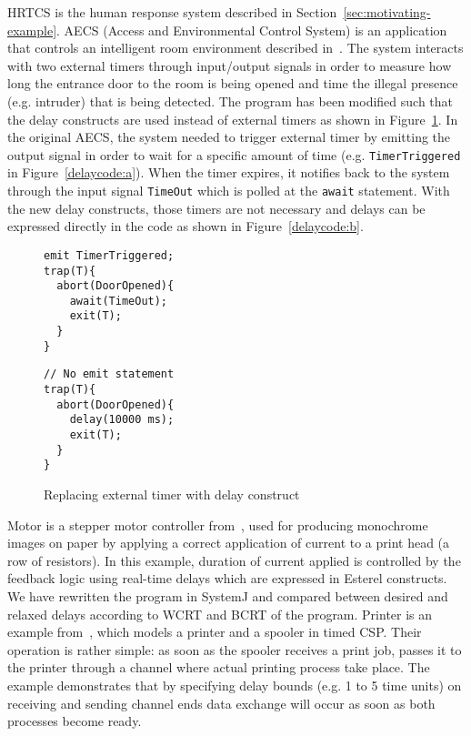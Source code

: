 HRTCS is the human response system described in
Section~\ref{sec:motivating-example}. AECS (Access and Environmental
Control System) is an application that controls an intelligent room
environment described in~\cite{aecs_ispa}.  The system interacts with
two external timers through input/output signals in order to measure how
long the entrance door to the room is being opened and time the illegal
presence (e.g. intruder) that is being detected. The program has been
modified such that the delay constructs are used instead of external
timers as shown in Figure~\ref{delaycode}. In the original AECS, the
system needed to trigger external timer by emitting the output signal in
order to wait for a specific amount of time (e.g.
\texttt{TimerTriggered} in Figure~\ref{delaycode:a}). When the timer
expires, it notifies back to the system through the input signal
\texttt{TimeOut} which is polled at the \texttt{await} statement. With
the new delay constructs, those timers are not necessary and delays can
be expressed directly in the code as shown in Figure~\ref{delaycode:b}.

\begin{figure}[h!]
	\begin{SubFloat}{\label{delaycode:a}}
		\centering
		\begin{minipage}[b]{0.3\linewidth}
			\scriptsize
\begin{verbatim}
emit TimerTriggered;
trap(T){
  abort(DoorOpened){
    await(TimeOut);
    exit(T); 
  }
}
\end{verbatim}
		\end{minipage}
	\end{SubFloat}
\hspace{1cm}%
	\begin{SubFloat}{\label{delaycode:b}}
		\centering
		\begin{minipage}[b]{0.5\linewidth}
			\scriptsize
\begin{verbatim}
// No emit statement
trap(T){
  abort(DoorOpened){
    delay(10000 ms);
    exit(T);  
  }
}
\end{verbatim}
		\end{minipage}
	\end{SubFloat}
\caption{Replacing external timer with delay construct}
\label{delaycode}
\end{figure}

Motor is a stepper motor controller from~\cite{Bourke2009a}, used for
producing monochrome images on paper by applying a correct application
of current to a print head (a row of resistors). In this example,
duration of current applied is controlled by the feedback logic using
real-time delays which are expressed in Esterel constructs. We have
rewritten the program in SystemJ and compared between desired and
relaxed delays according to WCRT and BCRT of the program. Printer is an
example from~\cite{Schneider:1999:CRT:555233}, which models a printer and
a spooler in timed CSP.  Their operation is rather simple: as soon as
the spooler receives a print job, passes it to the printer through a
channel where actual printing process take place. The example
demonstrates that by specifying delay bounds (e.g. 1 to 5 time units) on
receiving and sending channel ends data exchange will occur as soon as
both processes become ready.

